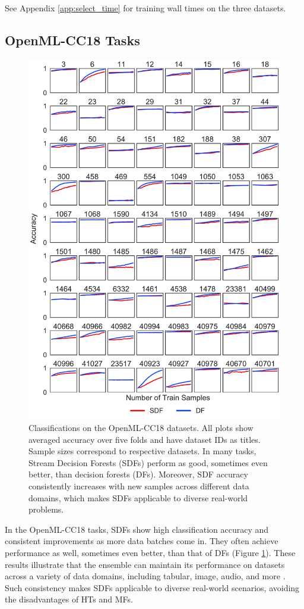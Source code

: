 See Appendix \ref{app:select_time} for training wall times on the three datasets.

\subsection{OpenML-CC18 Tasks}

\begin{figure}[!htpb]
\centering
\includegraphics[width=0.8\columnwidth]{cc18_wide}
  \caption{Classifications on the OpenML-CC18 datasets. All plots show averaged accuracy over five folds and have dataset IDs as titles. Sample sizes correspond to respective datasets. In many tasks, Stream Decision Forests (SDFs) perform as good, sometimes even better, than decision forests (DFs). Moreover, SDF accuracy consistently increases with new samples across different data domains, which makes SDFs applicable to diverse real-world problems.
  }
\label{fig:cc18}
\end{figure}

In the OpenML-CC18 tasks, SDFs show high classification accuracy and consistent improvements as more data batches come in. They often achieve performance as well, sometimes even better, than that of DFs (Figure \ref{fig:cc18}). These results illustrate that the ensemble can maintain its performance on datasets across a variety of data domains, including tabular, image, audio, and more \citep{bischl_openml_2019}. Such consistency makes SDFs applicable to diverse real-world scenarios, avoiding the disadvantages of HTs and MFs.

